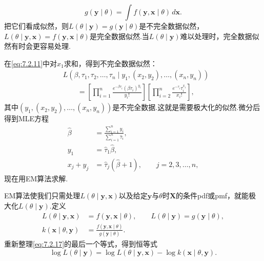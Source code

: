 \begin{equation}\label{eq:7.2.14}
g(\boldsymbol y\mid\theta)=\int f(\boldsymbol y,\boldsymbol x\mid\theta)\,d\boldsymbol x.
\end{equation}
把它们看成似然，则$L(\theta\mid\boldsymbol y)=g(\boldsymbol y\mid\theta)$是不完全数据似然，$L(\theta\mid\boldsymbol y,\boldsymbol x)=f(\boldsymbol y,\boldsymbol x\mid\theta)$是完全数据似然.当$L(\theta\mid\boldsymbol y)$难以处理时，完全数据似然有时会更容易处理.
\begin{example}[续\autoref{ex:7.2.17}]\label{ex:7.2.18}
在\eqref{eq:7.2.11}中对$x_1$求和，得到不完全数据似然：
\begin{equation}\label{eq:7.2.15}
\begin{aligned}
&L(\beta,\tau_1,\tau_2,\ldots,\tau_n\mid y_1,(x_2,y_2),\ldots,(x_n,y_n))\\
&\qquad=\left[\prod_{i=1}^n\frac{e^{-\beta\tau_i}(\beta\tau_i)^{y_i}}{y_i!}\right]\left[\prod_{i=2}^n\frac{e^{-\tau_i}\tau_i^{x_i}}{x_i!}\right],
\end{aligned}
\end{equation}
其中$(y_1,(x_2,y_2),\ldots,(x_n,y_n))$是不完全数据.这就是需要极大化的似然.微分后得到MLE方程
\begin{equation}\label{eq:7.2.16}
\begin{aligned}
\widehat\beta&=\frac{\sum_{i=1}^ny_i}{\sum_{i=1}^n\widehat\tau_i},\\
y_1&=\widehat\tau_1\widehat\beta,\\
x_j+y_j&=\widehat\tau_j(\widehat\beta+1),\qquad j=2,3,\ldots,n,
\end{aligned}
\end{equation}
现在用EM算法求解.
\end{example}
EM算法使我们只需处理$L(\theta\mid\boldsymbol y,\boldsymbol x)$以及给定$\boldsymbol y$与$\theta$时$\boldsymbol X$的条件pdf或pmf，就能极大化$L(\theta\mid\boldsymbol y)$.定义
\begin{equation}\label{eq:7.2.17}
\begin{aligned}
L(\theta\mid\boldsymbol y,\boldsymbol x)&=f(\boldsymbol y,\boldsymbol x\mid\theta),\qquad L(\theta\mid\boldsymbol y)=g(\boldsymbol y\mid\theta),\\
k(\boldsymbol x\mid\theta,\boldsymbol y)&=\frac{f(\boldsymbol y,\boldsymbol x\mid\theta)}{g(\boldsymbol y\mid\theta)}.
\end{aligned}
\end{equation}
重新整理\eqref{eq:7.2.17}的最后一个等式，得到恒等式
\begin{equation}\label{eq:7.2.18}
\log L(\theta\mid\boldsymbol y)=\log L(\theta\mid\boldsymbol y,\boldsymbol x)-\log k(\boldsymbol x\mid\theta,\boldsymbol y).
\end{equation}
